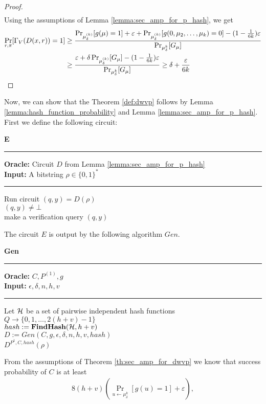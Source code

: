 \begin{proof}
\begin{align*}
 \end{align*}
 Using the assumptions of Lemma \ref{lemma:sec_amp_for_p_hash}, we get
 \begin{align}
   \label{eq:proof_final}
   \underset{r,\pi}{\Pr}[\Gamma_V(D(x,r)) = 1]
 &\geq \frac{ {\Pr}_{\mu_{\delta}^{(k)}}[g(\mu) = 1] + \epsilon +
 \Pr_{\mu_{\delta}^{(k)}}[g(0, \mu_2, \dots, \mu_k) = 0] - (1 - \frac{1}{6k})\epsilon}
 {\Pr_{\mu_{\delta}^{k}}[G_{\mu}]} \notag\\
 &\geq \frac{\epsilon +
\delta\Pr_{\mu_{\delta}^{(k)}}[G_{\mu}] - (1 - \frac{1}{6k})\epsilon}
{\Pr_{\mu_{\delta}^{k}}[G_{\mu}]} \geq \delta + \frac{\epsilon}{6k}
\end{align}
\end{proof}
Now, we can show that the Theorem \ref{def:dwvp} follows by Lemma \ref{lemma:hash_function_probability} and Lemma \ref{lemma:sec_amp_for_p_hash}.
First we define the following circuit:
\begin{codeblock}
  \textbf{E}
  \medskip
  \hrule
  \medskip
  \textbf{Oracle:} Circuit $D$ from Lemma \ref{lemma:sec_amp_for_p_hash}  \\
  \textbf{Input:} A bitstring $\rho \in \{0,1\}^{*}$
  \medskip\hrule\medskip
  Run circuit $(q,y) = D(\rho)$ \\
  \If $(q,y) \neq \bot$ \then \\
  \IndI make a verification query $(q,y)$
\end{codeblock}
%
The circuit $E$ is output by the following algorithm $Gen$.
\begin{codeblock}
  \textbf{Gen}
  \medskip
  \hrule
  \medskip
  \textbf{Oracle:}  $C, P^{(1)}, g$\\
  \textbf{Input:} $\epsilon, \delta, n, h, v$
  \medskip\hrule\medskip
  Let $\mathcal{H}$ be a set of pairwise independent hash functions $Q \rightarrow \{0, 1, \dots, 2(h+v)-1\}$ \\
  $hash := \textbf{FindHash}(\mathcal{H},h+v)$ \\
  $D := Gen(C, g, \epsilon, \delta, n, h, v, hash)$ \\
  \return $D^{P^{1}, C, hash}(\rho)$
\end{codeblock}
From the assumptions of Theorem \ref{th:sec_amp_for_dwvp} we know that success probability of $C$ is at least
\begin{align*}
8(h+v)\left(\underset{u \leftarrow \mu_\delta^k}{\Pr}\left[g(u) = 1\right] + \varepsilon\right),
\end{align*}
